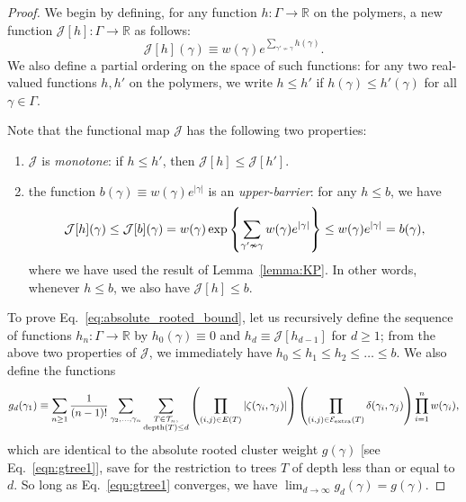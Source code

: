 \begin{proof}
    We begin by defining, for any function $h : \Gamma \to \mathbb{R}$ on the polymers, a new function $\mathcal{J}[h] : \Gamma \to \mathbb{R}$ as follows:
    \begin{equation}
        \mathcal{J}[h](\gamma) \equiv w(\gamma) e^{\sum_{\gamma' \nsim \gamma} h(\gamma)} .
    \end{equation}
    We also define a partial ordering on the space of such functions: for any two real-valued functions $h, h'$ on the polymers, we write $h \leq h'$ if $h(\gamma) \leq h'(\gamma)$ for all $\gamma \in \Gamma$.
    
    Note that the functional map $\mathcal{J}$ has the following two properties:
    \begin{enumerate}
        \item $\mathcal{J}$ is \emph{monotone}: if $h \leq h'$, then $\mathcal{J}[h] \leq \mathcal{J}[h']$.
        \item the function $b(\gamma) \equiv w(\gamma) e^{|\gamma|}$ is an \emph{upper-barrier}: for any $h \leq b$, we have
        \begin{equation}
            \mathcal{J}[h](\gamma) \leq \mathcal{J}[b](\gamma) = w(\gamma) \exp \qty{ \sum_{\gamma' \nsim \gamma} w(\gamma) e^{|\gamma|} } \leq w(\gamma) e^{|\gamma|} = b(\gamma) ,
        \end{equation}
        where we have used the result of Lemma~\ref{lemma:KP}. In other words, whenever $h \leq b$, we also have $\mathcal{J}[h] \leq b$.
    \end{enumerate}
To prove Eq.~\eqref{eq:absolute_rooted_bound}, let us recursively define the sequence of functions $h_n : \Gamma \to \mathbb{R}$ by $h_0(\gamma) \equiv 0$ and $h_d \equiv \mathcal{J}[h_{d-1}]$ for $d \geq 1$; from the above two properties of $\mathcal{J}$, we immediately have $h_0 \leq h_1 \leq h_2 \leq \ldots \leq b$. We also define the functions
\begin{equation}
    g_d(\gamma_1) \equiv \sum_{n \geq 1} \frac{1}{(n-1)!} \sum_{\gamma_2,\dots,\gamma_n} \sum_{\substack{T \in \mathcal{T}_n, \\ \text{depth}(T) \leq d}} \left( \prod_{(i,j) \in E(T)}\abs{\zeta(\gamma_i,\gamma_j)}  \right) \left(  \prod_{(i,j) \in \mathcal{E}_{\text{extra}}(T)} \delta(\gamma_i,\gamma_j)  \right)  \prod_{i = 1}^n w(\gamma_i) ,
\end{equation}
which are identical to the absolute rooted cluster weight $g(\gamma)$ [see Eq.~\eqref{eqn:gtree1}], save for the restriction to trees $T$ of depth less than or equal to $d$. So long as Eq.~\eqref{eqn:gtree1} converges, we have $\lim_{d \to \infty} g_d(\gamma) = g(\gamma)$. 


\end{proof}
